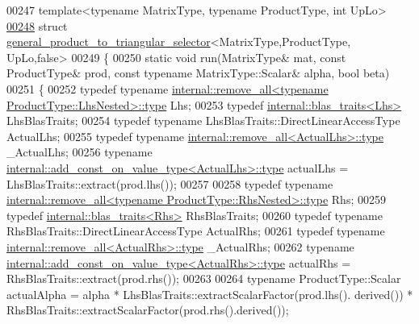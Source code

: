 \begin{DoxyCode}
00247 \textcolor{keyword}{template}<\textcolor{keyword}{typename} MatrixType, \textcolor{keyword}{typename} ProductType, \textcolor{keywordtype}{int} UpLo>
\hyperlink{struct_eigen_1_1general__product__to__triangular__selector_3_01_matrix_type_00_01_product_type_00_01_up_lo_00_01false_01_4}{00248} \textcolor{keyword}{struct }\hyperlink{struct_eigen_1_1general__product__to__triangular__selector}{general\_product\_to\_triangular\_selector}<MatrixType,ProductType,
      UpLo,false>
00249 \{
00250   \textcolor{keyword}{static} \textcolor{keywordtype}{void} run(MatrixType& mat, \textcolor{keyword}{const} ProductType& prod, \textcolor{keyword}{const} \textcolor{keyword}{typename} MatrixType::Scalar& alpha, \textcolor{keywordtype}{bool} 
      beta)
00251   \{
00252     \textcolor{keyword}{typedef} \textcolor{keyword}{typename} \hyperlink{group___sparse_core___module}{internal::remove\_all<typename ProductType::LhsNested>::type}
       Lhs;
00253     \textcolor{keyword}{typedef} \hyperlink{struct_eigen_1_1internal_1_1blas__traits}{internal::blas\_traits<Lhs>} LhsBlasTraits;
00254     \textcolor{keyword}{typedef} \textcolor{keyword}{typename} LhsBlasTraits::DirectLinearAccessType ActualLhs;
00255     \textcolor{keyword}{typedef} \textcolor{keyword}{typename} \hyperlink{group___sparse_core___module}{internal::remove\_all<ActualLhs>::type} \_ActualLhs;
00256     \textcolor{keyword}{typename} \hyperlink{group___sparse_core___module}{internal::add\_const\_on\_value\_type<ActualLhs>::type}
       actualLhs = LhsBlasTraits::extract(prod.lhs());
00257     
00258     \textcolor{keyword}{typedef} \textcolor{keyword}{typename} \hyperlink{group___sparse_core___module}{internal::remove\_all<typename ProductType::RhsNested>::type}
       Rhs;
00259     \textcolor{keyword}{typedef} \hyperlink{struct_eigen_1_1internal_1_1blas__traits}{internal::blas\_traits<Rhs>} RhsBlasTraits;
00260     \textcolor{keyword}{typedef} \textcolor{keyword}{typename} RhsBlasTraits::DirectLinearAccessType ActualRhs;
00261     \textcolor{keyword}{typedef} \textcolor{keyword}{typename} \hyperlink{group___sparse_core___module}{internal::remove\_all<ActualRhs>::type} \_ActualRhs;
00262     \textcolor{keyword}{typename} \hyperlink{group___sparse_core___module}{internal::add\_const\_on\_value\_type<ActualRhs>::type}
       actualRhs = RhsBlasTraits::extract(prod.rhs());
00263 
00264     \textcolor{keyword}{typename} ProductType::Scalar actualAlpha = alpha * LhsBlasTraits::extractScalarFactor(prod.lhs().
      derived()) * RhsBlasTraits::extractScalarFactor(prod.rhs().derived());

\end{DoxyCode}
